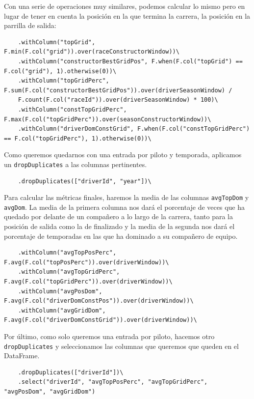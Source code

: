 \documentclass[12pt,twoside,titlepage]{report}
\begin{document}
Con una serie de operaciones muy similares, podemos calcular lo mismo pero en lugar de tener en cuenta la posición en la que termina la carrera, la posición en la parrilla de salida:

\begin{lstlisting}
	.withColumn("topGrid", F.min(F.col("grid")).over(raceConstructorWindow))\
	.withColumn("constructorBestGridPos", F.when(F.col("topGrid") == F.col("grid"), 1).otherwise(0))\
	.withColumn("topGridPerc", F.sum(F.col("constructorBestGridPos")).over(driverSeasonWindow) / 
	F.count(F.col("raceId")).over(driverSeasonWindow) * 100)\
	.withColumn("constTopGridPerc", F.max(F.col("topGridPerc")).over(seasonConstructorWindow))\
	.withColumn("driverDomConstGrid", F.when(F.col("constTopGridPerc") == F.col("topGridPerc"), 1).otherwise(0))\
\end{lstlisting}

Como queremos quedarnos con una entrada por piloto y temporada, aplicamos un \texttt{dropDuplicates} a las columnas pertinentes.

\begin{lstlisting}
	.dropDuplicates(["driverId", "year"])\	
\end{lstlisting}

Para calcular las métricas finales, haremos la media de las columnas \texttt{avgTopDom} y \texttt{avgDom}. La media de la primera columna nos dará el porcentaje de veces que ha quedado por delante de un compañero a lo largo de la carrera, tanto para la posición de salida como la de finalizado y la media de la segunda nos dará el porcentaje de temporadas en las que ha dominado a su compañero de equipo.

\begin{lstlisting}
	.withColumn("avgTopPosPerc", F.avg(F.col("topPosPerc")).over(driverWindow))\
	.withColumn("avgTopGridPerc", F.avg(F.col("topGridPerc")).over(driverWindow))\
	.withColumn("avgPosDom", F.avg(F.col("driverDomConstPos")).over(driverWindow))\
	.withColumn("avgGridDom", F.avg(F.col("driverDomConstGrid")).over(driverWindow))\
\end{lstlisting}

Por último, como solo queremos una entrada por piloto, hacemos otro \texttt{dropDuplicates} y seleccionamos las columnas que queremos que queden en el DataFrame.

\begin{lstlisting}
	.dropDuplicates(["driverId"])\
	.select("driverId", "avgTopPosPerc", "avgTopGridPerc", "avgPosDom", "avgGridDom")
\end{lstlisting}
\end{document}

